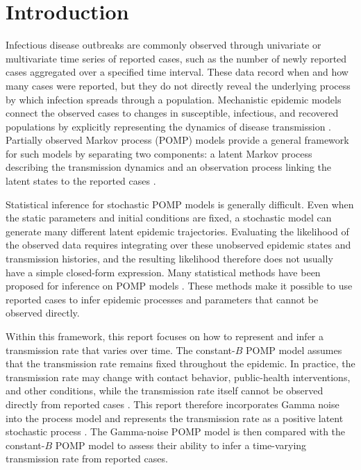 \section{Introduction}

Infectious disease outbreaks are commonly observed through univariate or multivariate time series of reported cases, such as the number of newly reported cases aggregated over a specified time interval. These data record when and how many cases were reported, but they do not directly reveal the underlying process by which infection spreads through a population. Mechanistic epidemic models connect the observed cases to changes in susceptible, infectious, and recovered populations by explicitly representing the dynamics of disease transmission \cite{breto2009mechanistic}. Partially observed Markov process (POMP) models provide a general framework for such models by separating two components: a latent Markov process describing the transmission dynamics and an observation process linking the latent states to the reported cases \cite{king2016pomp}.

Statistical inference for stochastic POMP models is generally difficult. Even when the static parameters and initial conditions are fixed, a stochastic model can generate many different latent epidemic trajectories. Evaluating the likelihood of the observed data requires integrating over these unobserved epidemic states and transmission histories, and the resulting likelihood therefore does not usually have a simple closed-form expression. Many statistical methods have been proposed for inference on POMP models \cite{breto2009mechanistic,king2016pomp}. These methods make it possible to use reported cases to infer epidemic processes and parameters that cannot be observed directly.

Within this framework, this report focuses on how to represent and infer a transmission rate that varies over time. The constant-$B$ POMP model assumes that the transmission rate remains fixed throughout the epidemic. In practice, the transmission rate may change with contact behavior, public-health interventions, and other conditions, while the transmission rate itself cannot be observed directly from reported cases \cite{bouman2024timevarying}. This report therefore incorporates Gamma noise into the process model and represents the transmission rate as a positive latent stochastic process \cite{breto2009mechanistic}. The Gamma-noise POMP model is then compared with the constant-$B$ POMP model to assess their ability to infer a time-varying transmission rate from reported cases.

